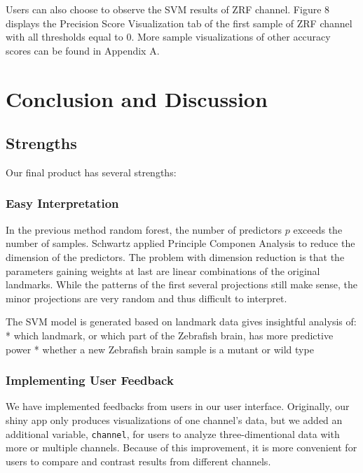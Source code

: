 \documentclass[10pt,letterpaper]{article}
\begin{document}
Users can also choose to observe the SVM results of ZRF channel. Figure
8 displays the Precision Score Visualization tab of the first sample of
ZRF channel with all thresholds equal to 0. More sample visualizations
of other accuracy scores can be found in Appendix A.

\section{Conclusion and Discussion}\label{conclusion-and-discussion}

\subsection{Strengths}\label{strengths}

Our final product has several strengths:

\subsubsection{Easy Interpretation}\label{easy-interpretation}

In the previous method random forest, the number of predictors \(p\)
exceeds the number of samples. Schwartz applied Principle Componen
Analysis to reduce the dimension of the predictors. The problem with
dimension reduction is that the parameters gaining weights at last are
linear combinations of the original landmarks. While the patterns of the
first several projections still make sense, the minor projections are
very random and thus difficult to interpret.

The SVM model is generated based on landmark data gives insightful
analysis of: * which landmark, or which part of the Zebrafish brain, has
more predictive power * whether a new Zebrafish brain sample is a mutant
or wild type

\subsubsection{Implementing User
Feedback}\label{implementing-user-feedback}

We have implemented feedbacks from users in our user interface.
Originally, our shiny app only produces visualizations of one channel's
data, but we added an additional variable, \texttt{channel}, for users
to analyze three-dimentional data with more or multiple channels.
Because of this improvement, it is more convenient for users to compare
and contrast results from different channels.
\end{document}
